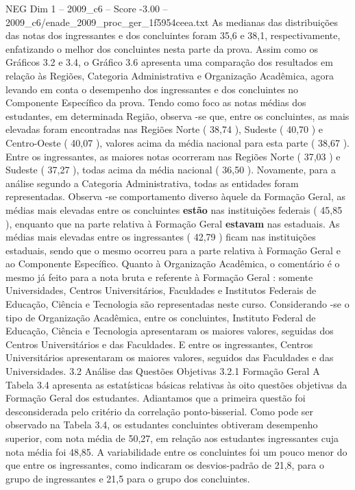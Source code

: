 \begin{textsample}{NEG Dim 1 – 2009\_c6 – Score -3.00 – 2009\_c6/enade\_2009\_proc\_ger\_1f5954ceea.txt}
As medianas das distribuições das notas dos ingressantes e dos concluintes foram 35,6 e 38,1, respectivamente, enfatizando o melhor dos concluintes nesta parte da prova.
Assim como os Gráficos 3.2 e 3.4, o Gráfico 3.6 apresenta uma comparação dos resultados em relação às Regiões, Categoria Administrativa e Organização Acadêmica, agora levando em conta o desempenho dos ingressantes e dos concluintes no Componente Específico da prova.
Tendo como foco as notas médias dos estudantes, em determinada Região, observa -se que, entre os concluintes, as mais elevadas foram encontradas nas Regiões Norte ( 38,74 ), Sudeste ( 40,70 ) e Centro-Oeste ( 40,07 ), valores acima da média nacional para esta parte ( 38,67 ).
Entre os ingressantes, as maiores notas ocorreram nas Regiões Norte ( 37,03 ) e Sudeste ( 37,27 ), todas acima da média nacional ( 36,50 ).
Novamente, para a análise segundo a Categoria Administrativa, todas as entidades foram representadas.
Observa -se comportamento diverso àquele da Formação Geral, as médias mais elevadas entre os concluintes \textbf{estão} nas instituições federais ( 45,85 ), enquanto que na parte relativa à Formação Geral \textbf{estavam} nas estaduais.
As médias mais elevadas entre os ingressantes ( 42,79 ) ficam nas instituições estaduais, sendo que o mesmo ocorreu para a parte relativa à Formação Geral e ao Componente Específico.
Quanto à Organização Acadêmica, o comentário é o mesmo já feito para a nota bruta e referente à Formação Geral : somente Universidades, Centros Universitários, Faculdades e Institutos Federais de Educação, Ciência e Tecnologia são representadas neste curso.
Considerando -se o tipo de Organização Acadêmica, entre os concluintes, Instituto Federal de Educação, Ciência e Tecnologia apresentaram os maiores valores, seguidas dos Centros Universitários e das Faculdades.
E entre os ingressantes, Centros Universitários apresentaram os maiores valores, seguidos das Faculdades e das Universidades. 3.2 Análise das Questões Objetivas 3.2.1 Formação Geral A Tabela 3.4 apresenta as estatísticas básicas relativas às oito questões objetivas da Formação Geral dos estudantes.
Adiantamos que a primeira questão foi desconsiderada pelo critério da correlação ponto-bisserial.
Como pode ser observado na Tabela 3.4, os estudantes concluintes obtiveram desempenho superior, com nota média de 50,27, em relação aos estudantes ingressantes cuja nota média foi 48,85.
A variabilidade entre os concluintes foi um pouco menor do que entre os ingressantes, como indicaram os desvios-padrão de 21,8, para o grupo de ingressantes e 21,5 para o grupo dos concluintes.

\end{textsample}
